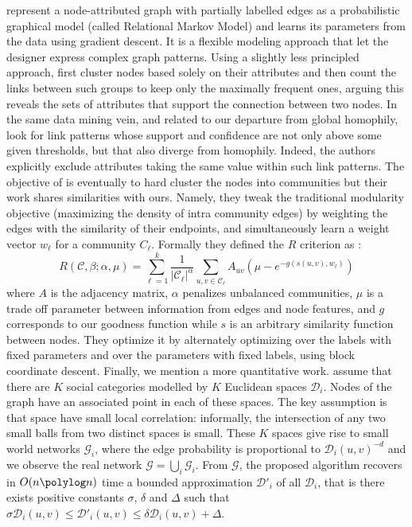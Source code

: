 \Textcite{Taskar04} represent a node-attributed graph with partially labelled edges as a
probabilistic graphical model (called Relational Markov Model) and learns its parameters from the
data using gradient descent. It is a flexible modeling approach that let the designer express
complex graph patterns. Using a slightly less principled approach, \textcite{conceptualLinks12}
first cluster nodes based solely on their attributes and then count the links between such groups to
keep only the maximally frequent ones, arguing this reveals the sets of attributes that support the
connection between two nodes. In the same data mining vein, and related to our departure from global
homophily, \textcite{beyondHome16} look for link patterns whose support and confidence are not only
above some given thresholds, but that also diverge from homophily. Indeed, the authors explicitly exclude
attributes taking the same value within such link patterns.
The objective of \textcite{ZhangModelFree16} is eventually to hard cluster the nodes into
communities but their work shares similarities with ours. Namely, they tweak the traditional modularity
objective (maximizing the density of intra community edges) by weighting the edges with the
similarity of their endpoints, and simultaneously learn a weight vector $w_\ell$ for a community
$C_\ell$. Formally they defined the $R$ criterion as :
\begin{equation*}
  R(\mathcal{C}, \beta;\alpha, \mu) = \sum_{\ell=1}^k \frac{1}{|\mathcal{C}_\ell|^\alpha}
  \sum_{u,v \in \mathcal{C}_\ell} A_{uv} \left( \mu -e^{-g(s(u,v), w_\ell)} \right)
\end{equation*}
where $A$ is the adjacency matrix, $\alpha$ penalizes unbalanced communities, $\mu$ is a trade off
parameter between information from edges and node features, and $g$ corresponds to our goodness
function while $s$ is an arbitrary similarity function between nodes.
They optimize it by alternately optimizing over the labels with fixed parameters and over
the parameters with fixed labels, using block coordinate descent.
Finally, we mention a more quantitative work. \Textcite{Abraham2012a} assume that there are $K$
social categories modelled by $K$ Euclidean spaces $\mathcal{D}_i$. Nodes of the graph have an
associated point in each of these spaces. The key assumption is that space have small local
correlation: informally, the intersection of any two small balls from two distinct spaces is small.
These $K$ spaces give rise to small world networks $\mathcal{G}_i$, where the edge probability
is proportional to $\mathcal{D}_i(u, v)^{-d}$ and we observe the real network $\mathcal{G} =\bigcup_i
\mathcal{G}_i$. From $\mathcal{G}$, the proposed algorithm recovers in $O(n \polylog n)$ time a
bounded approximation $\mathcal{D}'_i$ of all $\mathcal{D}_i$, that is there exists positive
constants $\sigma$, $\delta$ and $\Delta$ such that $
\sigma \mathcal{D}_i(u, v) \leq \mathcal{D}'_i(u, v) \leq \delta \mathcal{D}_i(u, v) + \Delta$.

